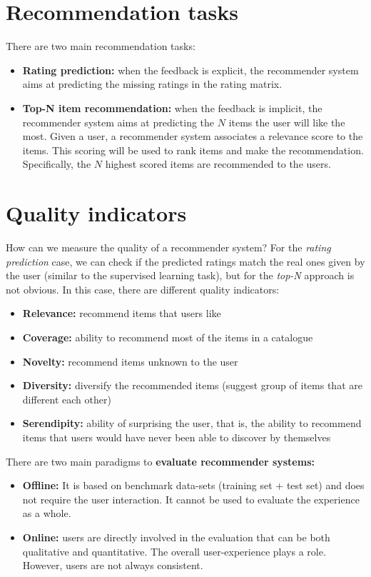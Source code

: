 \section{Recommendation tasks}
There are two main recommendation tasks:
\begin{itemize}
    \item \textbf{Rating prediction:} when the feedback is explicit, the recommender system aims at predicting the missing ratings in the rating matrix.
    \item \textbf{Top-N item recommendation:} when the feedback is implicit, the recommender system aims at predicting the $N$ items the user will like the most. Given a user, a recommender system associates a relevance score to the items. This scoring will be used to rank items and make the recommendation. Specifically, the $N$ highest scored items are recommended to the users.
\end{itemize}
\section{Quality indicators}
How can we measure the quality of a recommender system? For the \textit{rating prediction} case, we can check if the predicted ratings match the real ones given by the user (similar to the supervised learning task), but for the \textit{top-N} approach is not obvious. In this case, there are different quality indicators:
\begin{itemize}
    \item \textbf{Relevance:} recommend items that users like
    \item \textbf{Coverage:} ability to recommend most of the items in a catalogue
    \item \textbf{Novelty:} recommend items unknown to the user
    \item \textbf{Diversity:} diversify the recommended items (suggest group of items that are different each other)
    \item \textbf{Serendipity:} ability of surprising the user, that is, the ability to recommend items that users would have never been able to discover by themselves
\end{itemize}
There are two main paradigms to \textbf{evaluate recommender systems:}
\begin{itemize}
    \item \textbf{Offline:} It is based on benchmark data-sets (training set + test set) and does not require the user interaction. It cannot be used to evaluate the experience as a whole.
    \item \textbf{Online:} users are directly involved in the evaluation that can be both qualitative and quantitative. The overall user-experience plays a role. However, users are not always consistent.
\end{itemize}
